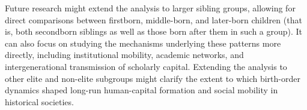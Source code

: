 Future research might extend the analysis to larger sibling groups, allowing for direct comparisons between firstborn, middle-born, and later-born children (that is, both secondborn siblings as well as those born after them in such a group). It can also focus on studying the mechanisms underlying these patterns more directly, including institutional mobility, academic networks, and intergenerational transmission of scholarly capital. Extending the analysis to other elite and non-elite subgroups might clarify the extent to which birth-order dynamics shaped long-run human-capital formation and social mobility in historical societies.
